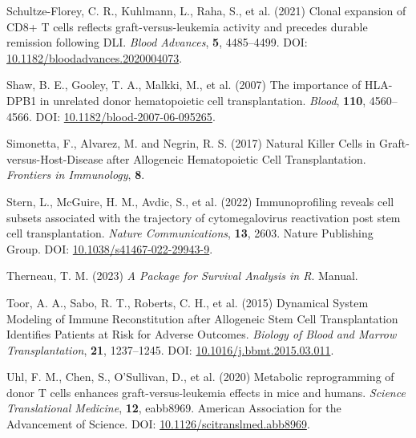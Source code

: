 \documentclass[
  letterpaper,
  DIV=11,
  numbers=noendperiod]{scrreprt}
\newlength{\cslhangindent}
\newlength{\cslentryspacingunit} %
\newenvironment{CSLReferences}[2] %
 {%
  \setlength{\parindent}{0pt}
  \ifodd #1
  \let\oldpar\par
  \def\par{\hangindent=\cslhangindent\oldpar}
  \fi
  \setlength{\parskip}{#2\cslentryspacingunit}
 }%
 {}
\begin{document}
\begin{CSLReferences}{1}{0}
\leavevmode{}%
Schultze-Florey, C. R., Kuhlmann, L., Raha, S., et al. (2021) Clonal
expansion of {CD8}+ {T} cells reflects graft-versus-leukemia activity
and precedes durable remission following {DLI}. \emph{Blood Advances},
\textbf{5}, 4485--4499. DOI:
\href{https://doi.org/10.1182/bloodadvances.2020004073}{10.1182/bloodadvances.2020004073}.

\leavevmode{}%
Shaw, B. E., Gooley, T. A., Malkki, M., et al. (2007) The importance of
{HLA-DPB1} in unrelated donor hematopoietic cell transplantation.
\emph{Blood}, \textbf{110}, 4560--4566. DOI:
\href{https://doi.org/10.1182/blood-2007-06-095265}{10.1182/blood-2007-06-095265}.

\leavevmode{}%
Simonetta, F., Alvarez, M. and Negrin, R. S. (2017) Natural {Killer
Cells} in {Graft-versus-Host-Disease} after {Allogeneic Hematopoietic
Cell Transplantation}. \emph{Frontiers in Immunology}, \textbf{8}.

\leavevmode{}%
Stern, L., McGuire, H. M., Avdic, S., et al. (2022) Immunoprofiling
reveals cell subsets associated with the trajectory of cytomegalovirus
reactivation post stem cell transplantation. \emph{Nature
Communications}, \textbf{13}, 2603. Nature Publishing Group. DOI:
\href{https://doi.org/10.1038/s41467-022-29943-9}{10.1038/s41467-022-29943-9}.

\leavevmode{}%
Therneau, T. M. (2023) \emph{A Package for Survival Analysis in {R}}.
Manual.

\leavevmode{}%
Toor, A. A., Sabo, R. T., Roberts, C. H., et al. (2015) Dynamical
{System Modeling} of {Immune Reconstitution} after {Allogeneic Stem Cell
Transplantation Identifies Patients} at {Risk} for {Adverse Outcomes}.
\emph{Biology of Blood and Marrow Transplantation}, \textbf{21},
1237--1245. DOI:
\href{https://doi.org/10.1016/j.bbmt.2015.03.011}{10.1016/j.bbmt.2015.03.011}.

\leavevmode{}%
Uhl, F. M., Chen, S., O'Sullivan, D., et al. (2020) Metabolic
reprogramming of donor {T} cells enhances graft-versus-leukemia effects
in mice and humans. \emph{Science Translational Medicine}, \textbf{12},
eabb8969. American Association for the Advancement of Science. DOI:
\href{https://doi.org/10.1126/scitranslmed.abb8969}{10.1126/scitranslmed.abb8969}.


\end{CSLReferences}
\end{document}
